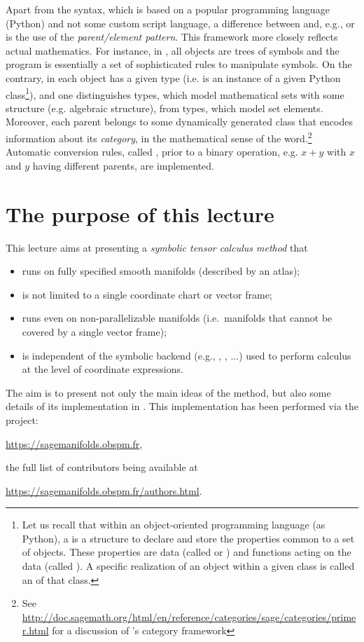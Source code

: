 Apart from the syntax, which is based on a popular programming language
(Python) and not some custom script
language, a difference between \Sage{} and, e.g.,  or 
is the use of the \emph{parent/element pattern}. This framework more closely
reflects actual mathematics.
For instance, in , all objects
are trees of symbols and the program is essentially a set of
sophisticated rules to manipulate symbols. On the contrary, in \Sage{}
each object has a given type (i.e. is an instance of a given
Python class\footnote{Let us
recall that within an object-oriented programming language (as Python),
a  is a structure to declare and store the
properties common to a set of objects. These properties
are data (called
 or ) and functions acting
on the data (called ). A specific realization of an object
within a given class is called an  of that class.}),
and one distinguishes  types, which model mathematical
sets with some structure (e.g. algebraic structure), from  types,
which model set elements. Moreover, each parent belongs to some
dynamically generated class that encodes information
about its \emph{category}, in the mathematical sense of the word.\footnote{See
\url{http://doc.sagemath.org/html/en/reference/categories/sage/categories/primer.html}
for a discussion of \Sage{}'s category framework}
Automatic conversion rules, called ,
prior to a binary operation, e.g. $x+y$ with $x$ and $y$ having different
parents, are implemented.

\section{The purpose of this lecture}

This lecture aims at presenting
a \emph{symbolic tensor calculus method} that
\begin{itemize}
\item runs on fully specified smooth manifolds (described by an atlas);
\item is not limited to a single coordinate chart or vector frame;
\item runs even on non-parallelizable manifolds (i.e.\ manifolds that cannot
be covered by a single vector frame);
\item is independent of the symbolic backend (e.g., ,
, ...) used to perform calculus at the level of coordinate expressions.
\end{itemize}
The aim is to present not only the main ideas of the method, but also some details of its implementation in \Sage{}. This implementation has been
performed via the  project:
\begin{center}
\url{https://sagemanifolds.obspm.fr},
\end{center}
the full list of contributors being available at
\begin{center}
\url{https://sagemanifolds.obspm.fr/authors.html}.
\end{center}
